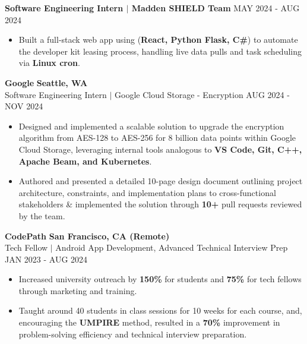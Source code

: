 \documentclass[10pt, letterpaper]{article}
\begin{document}
\vspace{1.5mm}
\noindent\textbf{Software Engineering Intern $|$ Madden SHIELD Team} \hfill MAY 2024 - AUG 2024
\begin{itemize}[leftmargin=*, noitemsep, topsep=1pt]
    \item Built a full-stack web app using (\textbf{React, Python Flask, C\#}) to automate the developer kit leasing process, handling live data pulls and task scheduling via \textbf{Linux cron}.
\end{itemize}

\vspace{1.5mm}
\noindent\textbf{Google} \hfill \textbf{Seattle, WA} \\
Software Engineering Intern $|$ Google Cloud Storage - Encryption \hfill AUG 2024 - NOV 2024
\begin{itemize}[leftmargin=*, noitemsep, topsep=1pt, itemsep=1pt]
    \item Designed and implemented a scalable solution to upgrade the encryption algorithm from AES-128 to AES-256 for 8 billion data points within Google Cloud Storage, leveraging internal tools analogous to \textbf{VS Code, Git, C++, Apache Beam, and Kubernetes}.
    \item Authored and presented a detailed 10-page design document outlining project architecture, constraints, and implementation plans to cross-functional stakeholders \& implemented the solution through \textbf{10+} pull requests reviewed by the team.
\end{itemize}

\vspace{1.5mm}
\noindent\textbf{CodePath} \hfill \textbf{San Francisco, CA (Remote)} \\
Tech Fellow $|$ Android App Development, Advanced Technical Interview Prep \hfill JAN 2023 - AUG 2024
\begin{itemize}[leftmargin=*, noitemsep, topsep=1pt, itemsep=1pt]
    \item Increased university outreach by \textbf{150\%} for students and \textbf{75\%} for tech fellows through marketing and training.
    \item Taught around 40 students in class sessions for 10 weeks for each course, and, encouraging the \textbf{UMPIRE} method, resulted in a \textbf{70\%} improvement in problem-solving efficiency and technical interview preparation.
\end{itemize}

\end{document}
